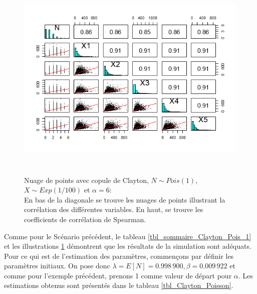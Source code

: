 \documentclass{article}
\begin{document}
	\begin{figure}[H]
		\centering
		\includegraphics[height=10cm]{Graph/scatterplot_Poisson_1.png}
		\caption[Nuage de points avec copule de Clayton, $N\sim Pois(1)$ et $X\sim Exp(1/100)$]{Nuage de points avec copule de Clayton, $N\sim Pois(1)$, $X\sim Exp(1/100)$ et $\alpha = 6$: \\
			En bas de la diagonale se trouve les nuages de points illustrant la corrélation des différentes variables. En haut, se trouve les coefficients de corrélation de Spearman.} 
		\label{graph_scatterplot_Poiss_1}
	\end{figure}

	Comme pour le Scénario précédent, le tableau \ref{tbl_sommaire_Clayton_Pois_1} et les illustrations \ref{graph_scatterplot_Poiss_1} démontrent que les résultats de la simulation sont adéquats.\\
	
	Pour ce qui est de l'estimation des paramètres, commençons par définir les paramètres initiaux. On pose donc $\lambda = E[N] = 0.998\,900, \beta = 0.009\,922$ et comme pour l'exemple précédent, prenons 1 comme valeur de départ pour $\alpha$. Les estimations obtenus sont présentés dans le tableau \ref{tbl_Clayton_Poisson}.
	
\end{document}
